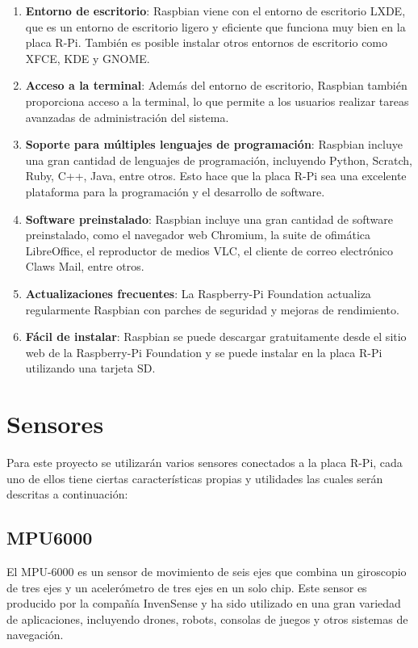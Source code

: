 \begin{enumerate}
\item \textbf{Entorno de escritorio}: Raspbian viene con el entorno de escritorio LXDE, que es un entorno de escritorio ligero y eficiente que funciona muy bien en la placa R-Pi. También es posible instalar otros entornos de escritorio como XFCE, KDE y GNOME.
\item \textbf{Acceso a la terminal}: Además del entorno de escritorio, Raspbian también proporciona acceso a la terminal, lo que permite a los usuarios realizar tareas avanzadas de administración del sistema.
\item \textbf{Soporte para múltiples lenguajes de programación}: Raspbian incluye una gran cantidad de lenguajes de programación, incluyendo Python, Scratch, Ruby, C++, Java, entre otros. Esto hace que la placa R-Pi sea una excelente plataforma para la programación y el desarrollo de software.
\item \textbf{Software preinstalado}: Raspbian incluye una gran cantidad de software preinstalado, como el navegador web Chromium, la suite de ofimática LibreOffice, el reproductor de medios VLC, el cliente de correo electrónico Claws Mail, entre otros.
\item \textbf{Actualizaciones frecuentes}: La Raspberry-Pi Foundation actualiza regularmente Raspbian con parches de seguridad y mejoras de rendimiento.
\item \textbf{Fácil de instalar}: Raspbian se puede descargar gratuitamente desde el sitio web de la Raspberry-Pi Foundation y se puede instalar en la placa R-Pi utilizando una tarjeta SD.
\end{enumerate}


\section{Sensores}

Para este proyecto se utilizarán varios sensores conectados a la placa R-Pi, cada uno de ellos tiene ciertas características propias y utilidades las cuales serán descritas a continuación:

\subsection{MPU6000}

El MPU-6000 es un sensor de movimiento de seis ejes que combina un giroscopio de tres ejes y un acelerómetro de tres ejes en un solo chip. Este sensor es producido por la compañía InvenSense y ha sido utilizado en una gran variedad de aplicaciones, incluyendo drones, robots, consolas de juegos y otros sistemas de navegación.

